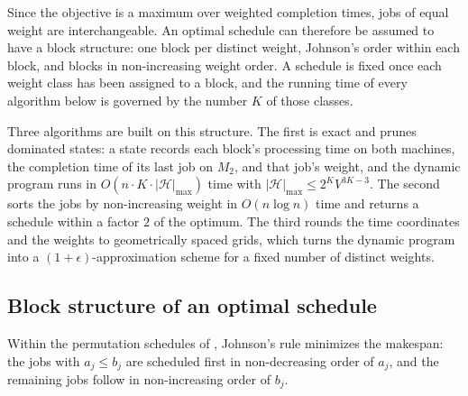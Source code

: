 \documentclass[12pt]{article}
\begin{document}
\begin{sloppypar}
        Since the objective is a maximum over weighted completion times, jobs of equal weight are
        interchangeable. An optimal schedule can therefore be assumed to have a block structure:
        one block per distinct weight, Johnson's order within each block, and blocks in
        non-increasing weight order. A schedule is fixed once each weight class has been assigned to
        a block, and the running time of every algorithm below is governed by the number $K$ of those
        classes.
        
        Three algorithms are built on this structure. The first is exact and prunes dominated states:
        a state records each block's processing time on both machines, the completion time of its last
        job on $M_2$, and that job's weight, and the dynamic program runs in
        $O(n \cdot K \cdot |\mathscr{H}|_{\max})$ time with
        $|\mathscr{H}|_{\max} \le 2^{K}V^{3K-3}$. The second sorts the jobs by non-increasing weight in
        $O(n\log n)$ time and returns a schedule within a factor $2$ of the optimum. The third rounds
        the time coordinates and the weights to geometrically spaced grids, which turns the dynamic
        program into a $(1+\epsilon)$-approximation scheme for a fixed number of distinct weights.
        
        \subsection{Block structure of an optimal schedule}
        Within the permutation schedules of , Johnson's rule
        \citep{johnson1954optimal} minimizes the makespan: the jobs with $a_j \le b_j$ are scheduled
        first in non-decreasing order of $a_j$, and the remaining jobs follow in non-increasing order of
        $b_j$.
        

\end{sloppypar}
\end{document}
